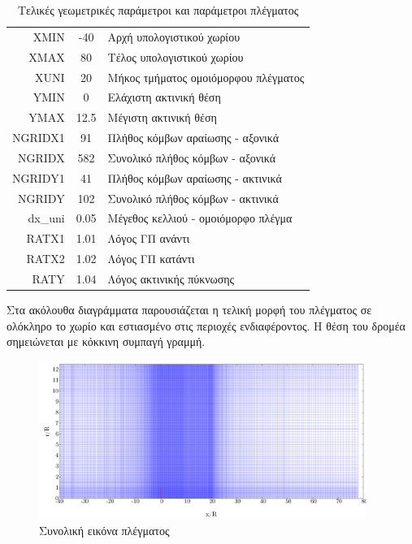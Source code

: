 \begin{table}[h!]
    \begin{center}
        \begin{tabular}[c]{|r|c|l|}
            \hline
            XMIN & -40 & Αρχή υπολογιστικού χωρίου\\
            XMAX & 80 & Τέλος υπολογιστικού χωρίου\\
            XUNI & 20 & Μήκος τμήματος ομοιόμορφου πλέγματος\\
            YMIN & 0  & Ελάχιστη ακτινική θέση\\
            YMAX & 12.5 & Μέγιστη ακτινική θέση\\
            NGRIDX1 & 91 & Πλήθος κόμβων αραίωσης - αξονικά\\
            NGRIDX & 582 & Συνολικό πλήθος κόμβων - αξονικά\\
            NGRIDY1 & 41 & Πλήθος κόμβων αραίωσης - ακτινικά\\
            NGRIDY & 102 & Συνολικό πλήθος κόμβων - ακτινικά\\
            dx\_uni & 0.05 & Μέγεθος κελλιού - ομοιόμορφο πλέγμα\\
            RATX1 & 1.01 & Λόγος ΓΠ ανάντι\\
            RATX2 & 1.02 & Λόγος ΓΠ κατάντι\\
            RATY & 1.04 & Λόγος ακτινικής πύκνωσης\\
            \hline
        \end{tabular}
    \end{center}
    \caption{Τελικές γεωμετρικές παράμετροι και παράμετροι πλέγματος}
    \label{tab:geom_mesh}
\end{table}

Στα ακόλουθα διαγράμματα παρουσιάζεται η τελική μορφή του πλέγματος σε ολόκληρο το χωρίο και εστιασμένο στις περιοχές ενδιαφέροντος. Η θέση του δρομέα σημειώνεται με κόκκινη συμπαγή γραμμή.

\begin{figure}[h!]
    \begin{center}
        \includegraphics[width=0.95\textwidth]{figures/meshAll.pdf}
    \end{center}
    \caption{Συνολική εικόνα πλέγματος}
    \label{fig:meshAll}
\end{figure}

